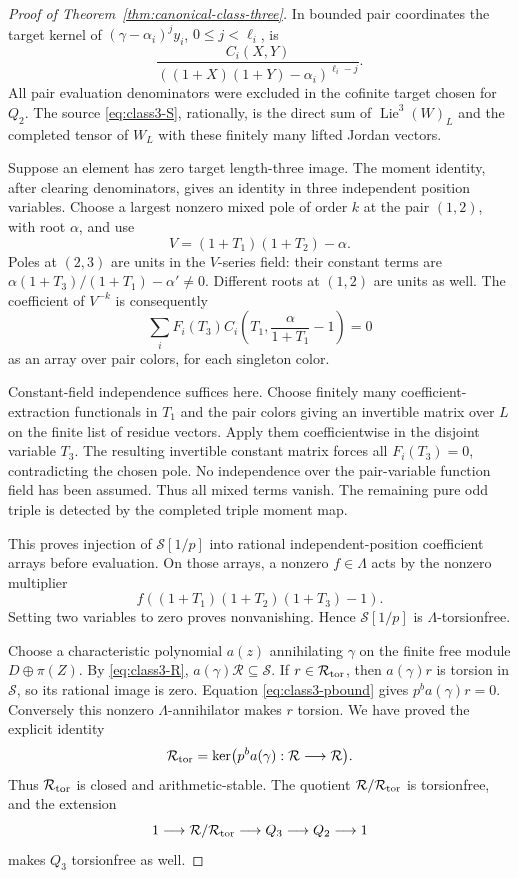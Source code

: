 \begin{proof}[Proof of Theorem~\ref{thm:canonical-class-three}]
In bounded pair coordinates the target kernel of
\((\gamma-\alpha_i)^jy_i\), \(0\le j<\ell_i\), is
\[
 \frac{C_i(X,Y)}
 {((1+X)(1+Y)-\alpha_i)^{\ell_i-j}}.
\]
All pair evaluation denominators were excluded in the
cofinite target chosen for \(Q_2\).
The source \eqref{eq:class3-S}, rationally, is the direct sum
of \(\operatorname{Lie}^3(W)_L\) and the completed tensor
of \(W_L\) with these finitely many lifted Jordan vectors.

Suppose an element has zero target length-three image.
The moment identity, after clearing denominators, gives
an identity in three independent position variables.
Choose a largest nonzero mixed pole of order \(k\) at
the pair \((1,2)\), with root \(\alpha\), and use
\[
 V=(1+T_1)(1+T_2)-\alpha.
\]
Poles at \((2,3)\) are units in the \(V\)-series field:
their constant terms are
\(\alpha(1+T_3)/(1+T_1)-\alpha'\ne0\).
Different roots at \((1,2)\) are units as well.
The coefficient of \(V^{-k}\) is consequently
\[
 \sum_i F_i(T_3)
 C_i\!\left(T_1,\frac{\alpha}{1+T_1}-1\right)=0
\]
as an array over pair colors, for each singleton color.

Constant-field independence suffices here. Choose finitely
many coefficient-extraction functionals in \(T_1\) and
the pair colors giving an invertible matrix over \(L\)
on the finite list of residue vectors.
Apply them coefficientwise in the disjoint variable
\(T_3\). The resulting invertible constant matrix forces
all \(F_i(T_3)=0\), contradicting the chosen pole.
No independence over the pair-variable function field
has been assumed. Thus all mixed terms vanish.
The remaining pure odd triple is detected by the completed
triple moment map.

This proves injection of \(\mathcal S[1/p]\) into rational
independent-position coefficient arrays before evaluation.
On those arrays, a nonzero \(f\in\Lambda\) acts by the
nonzero multiplier
\[
 f((1+T_1)(1+T_2)(1+T_3)-1).
\]
Setting two variables to zero proves nonvanishing.
Hence \(\mathcal S[1/p]\) is \(\Lambda\)-torsionfree.

Choose a characteristic polynomial \(a(z)\) annihilating
\(\gamma\) on the finite free module \(D\oplus\pi(Z)\).
By \eqref{eq:class3-R}, \(a(\gamma)\mathcal R\subseteq \mathcal S\).
If \(r\in \mathcal R_{\rm tor}\), then \(a(\gamma)r\) is torsion
in \(\mathcal S\), so its rational image is zero. Equation
\eqref{eq:class3-pbound} gives \(p^ba(\gamma)r=0\).
Conversely this nonzero \(\Lambda\)-annihilator makes
\(r\) torsion. We have proved the explicit identity
\[
 \mathcal R_{\rm tor}
 =\ker\bigl(p^ba(\gamma):\mathcal R\longrightarrow \mathcal R\bigr).
\]
Thus \(\mathcal R_{\rm tor}\) is closed and arithmetic-stable.
The quotient \(\mathcal R/\mathcal R_{\rm tor}\) is torsionfree, and the
extension
\[
 1\longrightarrow \mathcal R/\mathcal R_{\rm tor}
 \longrightarrow Q_3\longrightarrow Q_2\longrightarrow1
\]
makes \(Q_3\) torsionfree as well.


\end{proof}
